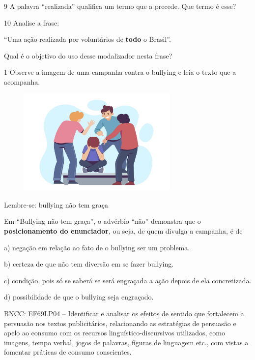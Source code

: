 \num{9} A palavra ``realizada'' qualifica um termo que a precede. Que
termo é esse?



\num{10} Analise a frase:

``Uma ação realizada por voluntários de \textbf{{todo}} o Brasil''.

Qual é o objetivo do uso desse modalizador nesta frase?




\num{1} Observe a imagem de uma campanha contra o bullying e leia o
texto que a acompanha.

\begin{figure}
\includegraphics[width=0.7\textwidth]{./imgSAEB_6_POR/freepik/PORT_6_IMG-27.jpeg}
\end{figure}

Lembre-se: bullying não tem graça

Em ``Bullying não tem graça'', o advérbio ``não'' demonstra que o
\textbf{posicionamento do enunciador}, ou seja, de quem divulga a
campanha, é de

a) negação em relação ao fato de o bullying ser um problema.

b) certeza de que não tem diversão em se fazer bullying.

c) condição, pois só se saberá se será engraçada a ação depois de ela
concretizada.

d) possibilidade de que o bullying seja engraçado.

BNCC: EF69LP04 -- Identificar e analisar os efeitos de sentido que
fortalecem a persuasão nos textos publicitários, relacionando as
estratégias de persuasão e apelo ao consumo com os recursos
linguístico-discursivos utilizados, como imagens, tempo verbal, jogos de
palavras, figuras de linguagem etc., com vistas a fomentar práticas de
consumo conscientes.


